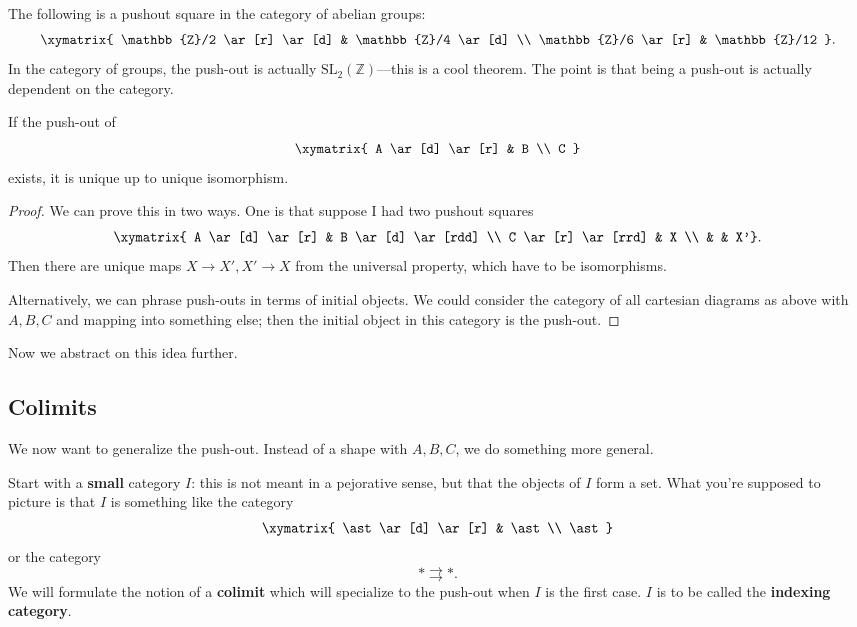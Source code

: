 \begin{example} 
The following is a pushout square in the category of abelian groups:
\[ \xymatrix{
\mathbb{Z}/2 \ar[r] \ar[d]  &  \mathbb{Z}/4 \ar[d]  \\ 
\mathbb{Z}/6 \ar[r] &  \mathbb{Z}/12
}.\]
In the category of groups, the push-out is actually
$\mathrm{SL}_2(\mathbb{Z})$---this is a cool theorem. The point is that being a
push-out is actually dependent on the category.
\end{example} 

\begin{proposition} 
If the push-out of 
\[ \xymatrix{
A \ar[d] \ar[r] & B \\
C
}\]
exists, it is unique up to unique isomorphism. 
\end{proposition} 
\begin{proof} 
We can prove this in two ways. One is that suppose I had two pushout squares
\[ 
\xymatrix{
A \ar[d] \ar[r] &  B \ar[d] \ar[rdd] \\
C \ar[r] \ar[rrd] &  X \\
& & X'}.
\]
Then there are unique maps $X \to X', X' \to X$ from the universal property,
which have to be isomorphisms. 

Alternatively, we can phrase push-outs in terms of initial objects. We could
consider the category of all cartesian diagrams as above with $A,B,C$ and
mapping into something else; then the initial
object in this category is the push-out.
\end{proof} 

Now we abstract on this idea further.

\subsection{Colimits}


We now want to generalize the push-out. 
Instead of a shape with $A,B,C$, we do something more general.

Start with a \textbf{small} category $I$: this is not meant in a pejorative
sense, but that the objects of $I$ form a set. What you're supposed to picture
is that $I$ is something like the category
\[ 
\xymatrix{
\ast \ar[d] \ar[r] &  \ast \\
\ast
}
\]
or the category
\[ \ast \rightrightarrows \ast.  \]
We will formulate the notion of a \textbf{colimit} which will specialize to the
push-out when $I$ is the first case. $I$ is to be called the \textbf{indexing
category}. 

